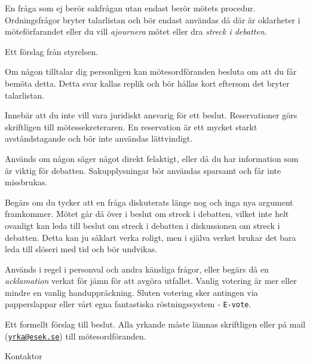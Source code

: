 \documentclass[../_main/handlingar.tex]{subfiles}
\begin{document}
\begin{description}[style=multiline, leftmargin=45mm]
    \item[Ordningsfråga]
    En fråga som ej berör sakfrågan utan endast berör mötets procedur. Ordningsfrågor bryter talarlistan och bör endast användas då där är oklarheter i möteförfarandet eller du vill \emph{ajournera} mötet eller dra \emph{streck i debatten}.
    \item[Proposition]
    Ett förslag från styrelsen.
    \item[Replik]
    Om någon tilltalar dig personligen kan mötesordföranden besluta om att du får bemöta detta. Detta svar kallas replik och bör hållas kort eftersom det bryter talarlistan.
    \item[Reservation]
    Innebär att du inte vill vara juridiskt ansvarig för ett beslut. Reservationer görs skriftligen till mötessekreteraren. En reservation är ett mycket starkt avståndstagande och bör inte användas lättvindigt.
    \item[Sakupplysning]
    Används om någon säger något direkt felaktigt, eller då du har information som är viktig för debatten. Sakupplysningar bör användas sparsamt och får inte missbrukas.
    \item[Streck i debatten]
    Begärs om du tycker att en fråga diskuterats länge nog och inga nya argument framkommer. Mötet går då över i beslut om streck i debatten, vilket inte helt ovanligt kan leda till beslut om streck i debatten i diskussionen om streck i debatten. Detta kan ju såklart verka roligt, men i själva verket brukar det bara leda till slöseri med tid och bör undvikas.
    \item[Votering]
    Används i regel i personval och andra känsliga frågor, eller begärs då en \emph{acklamation} verkat för jämn för att avgöra utfallet. Vanlig votering är mer eller mindre en vanlig handuppräckning. Sluten votering sker antingen via papperslappar eller vårt egna fantastiska röstningssystem - \texttt{E-vote}.
    \item[Yrkande]
    Ett formellt förslag till beslut. Alla yrkande måste lämnas skriftligen eller på mail (\href{mailto:yrka@esek.se}{\texttt{yrka@esek.se}}) till mötesordföranden.
\end{description}

\begin{signatures}{1}
    \mvh
    \signature{Erik Månsson}{Kontaktor}
\end{signatures}
\end{document}
